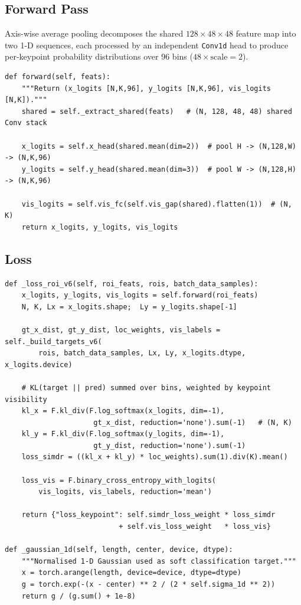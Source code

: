 \subsection*{Forward Pass}

Axis-wise average pooling decomposes the shared $128 \times 48 \times 48$
feature map into two 1-D sequences, each processed by an independent
\texttt{Conv1d} head to produce per-keypoint probability distributions
over 96 bins ($48 \times \text{scale}=2$).

\begin{lstlisting}[caption={ SimDR axis-pooling},
                   label={lst:simdr-forward}]
def forward(self, feats):
    """Return (x_logits [N,K,96], y_logits [N,K,96], vis_logits [N,K])."""
    shared = self._extract_shared(feats)   # (N, 128, 48, 48) shared Conv stack

    x_logits = self.x_head(shared.mean(dim=2))  # pool H -> (N,128,W) -> (N,K,96)
    y_logits = self.y_head(shared.mean(dim=3))  # pool W -> (N,128,H) -> (N,K,96)

    vis_logits = self.vis_fc(self.vis_gap(shared).flatten(1))  # (N, K)
    return x_logits, y_logits, vis_logits
\end{lstlisting}

\subsection*{Loss}

\begin{lstlisting}[caption={ KL divergence loss and 1-D Gaussian target},
                   label={lst:simdr-loss}]
def _loss_roi_v6(self, roi_feats, rois, batch_data_samples):
    x_logits, y_logits, vis_logits = self.forward(roi_feats)
    N, K, Lx = x_logits.shape;  Ly = y_logits.shape[-1]

    gt_x_dist, gt_y_dist, loc_weights, vis_labels = self._build_targets_v6(
        rois, batch_data_samples, Lx, Ly, x_logits.dtype, x_logits.device)

    # KL(target || pred) summed over bins, weighted by keypoint visibility
    kl_x = F.kl_div(F.log_softmax(x_logits, dim=-1),
                     gt_x_dist, reduction='none').sum(-1)   # (N, K)
    kl_y = F.kl_div(F.log_softmax(y_logits, dim=-1),
                     gt_y_dist, reduction='none').sum(-1)
    loss_simdr = ((kl_x + kl_y) * loc_weights).sum(1).div(K).mean()

    loss_vis = F.binary_cross_entropy_with_logits(
        vis_logits, vis_labels, reduction='mean')

    return {"loss_keypoint": self.simdr_loss_weight * loss_simdr
                           + self.vis_loss_weight   * loss_vis}

def _gaussian_1d(self, length, center, device, dtype):
    """Normalised 1-D Gaussian used as soft classification target."""
    x = torch.arange(length, device=device, dtype=dtype)
    g = torch.exp(-(x - center) ** 2 / (2 * self.sigma_1d ** 2))
    return g / (g.sum() + 1e-8)
\end{lstlisting}

